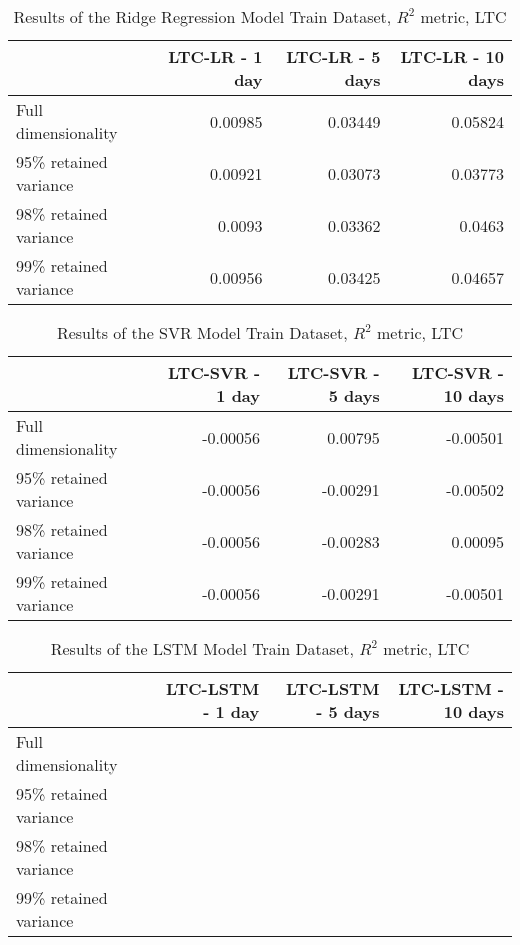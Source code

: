 
\begin{table}[htbp]
    \centering
    \caption{Results of the Ridge Regression Model Train Dataset, $R^2$ metric, LTC}
    \begin{tabular}{lrrr}
        \toprule
        {} &  LTC-LR - 1 day &  LTC-LR - 5 days &  LTC-LR - 10 days \\
        \midrule
        Full dimensionality   &    0.00985      &   0.03449       &     0.05824       \\
        95\% retained variance &    0.00921     & 0.03073   &       0.03773    \\
        98\% retained variance &     0.0093  &       0.03362 &    0.0463  \\
        99\% retained variance &    0.00956   &     0.03425    &   0.04657  \\
        \bottomrule
    \end{tabular}
    \end{table}
    
    
    \begin{table}[htbp]
        \centering
        \caption{Results of the SVR Model Train Dataset, $R^2$ metric, LTC}
    \begin{tabular}{lrrr}
        \toprule
        {} &  LTC-SVR - 1 day &  LTC-SVR - 5 days &  LTC-SVR - 10 days \\
        \midrule
        Full dimensionality   &   -0.00056  &    0.00795     &    -0.00501     \\
        95\% retained variance &   -0.00056 &     -0.00291    &      -0.00502     \\
        98\% retained variance &  -0.00056   &     -0.00283    &     0.00095    \\
        99\% retained variance &  -0.00056  &    -0.00291     &   -0.00501  \\
        \bottomrule
    \end{tabular}
    \end{table}
    
    \begin{table}[htbp]
        \centering
        \caption{Results of the LSTM Model Train Dataset, $R^2$ metric, LTC}
    \begin{tabular}{lrrr}
        \toprule
        {} &  LTC-LSTM - 1 day &  LTC-LSTM - 5 days &  LTC-LSTM - 10 days \\
        \midrule
        Full dimensionality   &       &           &           \\
        95\% retained variance &       &           &            \\
        98\% retained variance &       &          &            \\
        99\% retained variance &      &       &           \\
        \bottomrule
    \end{tabular}
    \end{table}
    
